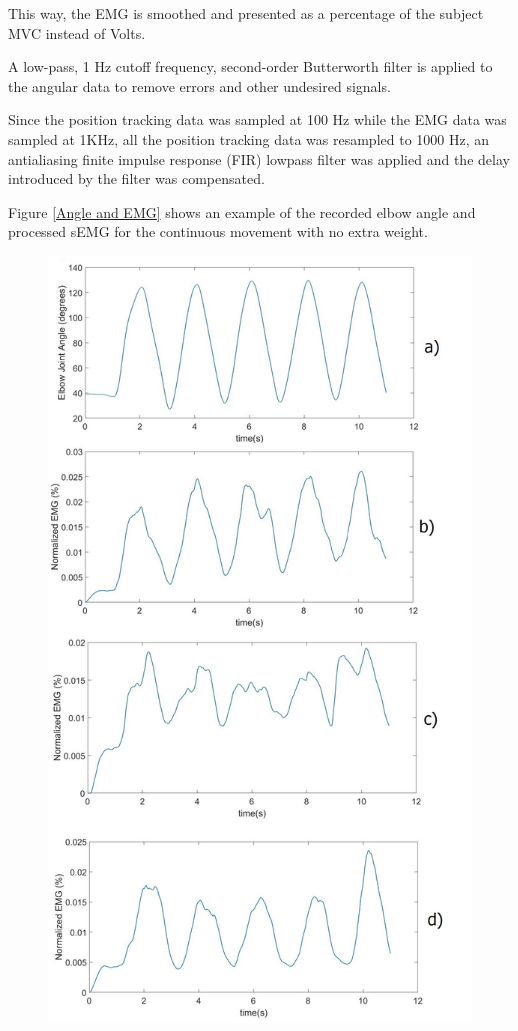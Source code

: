 \documentclass[letterpaper, 10 pt, conference]{ieeeconf}  %
\begin{document}
This way, the EMG is smoothed and presented as a percentage of the subject MVC instead of Volts.

A low-pass, 1 Hz cutoff frequency, second-order Butterworth filter is applied to the angular data to remove errors and other undesired signals.

Since the position tracking data was sampled at 100 Hz while the EMG data was sampled at 1KHz, all the position tracking data was resampled to 1000 Hz, an antialiasing finite impulse response (FIR) lowpass filter was applied and the delay introduced by the filter was compensated.

Figure \ref{Angle and EMG} shows an example of the recorded elbow angle and processed sEMG for the continuous movement with no extra weight.

\begin{figure}[thpb]
      \centering
      \includegraphics[scale=0.25]{Images/Angle_and_EMGs.jpg}

\end{figure}
\end{document}
